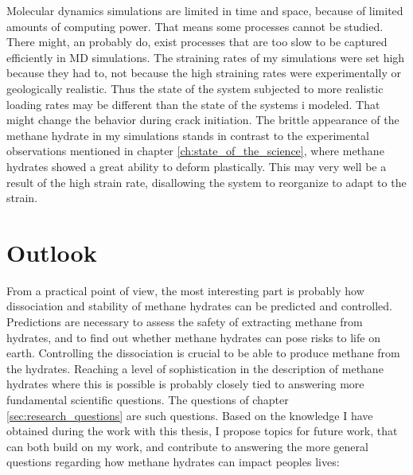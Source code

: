Molecular dynamics simulations are limited in time and space, because of limited amounts of computing power. That means some processes cannot be studied. There might, an probably do, exist processes that are too slow to be captured efficiently in MD simulations. The straining rates of my simulations were set high because they had to, not because the high straining rates were experimentally or geologically realistic. Thus the state of the system subjected to more realistic loading rates may be different than the state of the systems i modeled. That might change the behavior during crack initiation. The brittle appearance of the methane hydrate in my simulations stands in contrast to the experimental observations mentioned in chapter \ref{ch:state_of_the_science}, where methane hydrates showed a great ability to deform plastically. This may very well be a result of the high strain rate, disallowing the system to reorganize to adapt to the strain.


\section{Outlook}

From a practical point of view, the most interesting part is probably how dissociation and stability of methane hydrates can be predicted and controlled. Predictions are necessary to assess the safety of extracting methane from hydrates, and to find out whether methane hydrates can pose risks to life on earth. Controlling the dissociation is crucial to be able to produce methane from the hydrates. Reaching a level of sophistication in the description of methane hydrates where this is possible is probably closely tied to answering more fundamental scientific questions. The questions of chapter \ref{sec:research_questions} are such questions. Based on the knowledge I have obtained during the work with this thesis, I propose topics for future work, that can both build on my work, and contribute to answering the more general questions regarding how methane hydrates can impact peoples lives:


